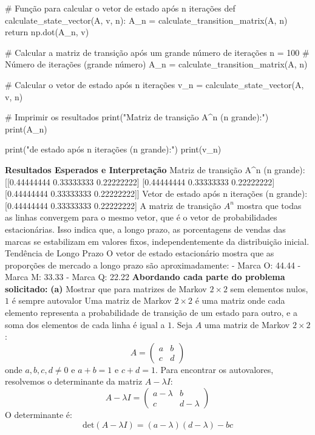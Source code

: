 {{{{        # Função para calcular o vetor de estado após n iterações
        def calculate_state_vector(A, v, n):
            A_n = calculate_transition_matrix(A, n)
            return np.dot(A_n, v)
        
        # Calcular a matriz de transição após um grande número de iterações
        n = 100  # Número de iterações (grande número)
        A_n = calculate_transition_matrix(A, n)
        
        # Calcular o vetor de estado após n iterações
        v_n = calculate_state_vector(A, v, n)
        
        # Imprimir os resultados
        print("Matriz de transição A^n (n grande):")
        print(A_n)
        
        print("\nVetor de estado após n iterações (n grande):")
        print(v_n)
}
\textbf{Resultados Esperados e Interpretação}
Matriz de transição A^n (n grande):
[[0.44444444 0.33333333 0.22222222]
 [0.44444444 0.33333333 0.22222222]
 [0.44444444 0.33333333 0.22222222]]
Vetor de estado após n iterações (n grande):
[0.44444444 0.33333333 0.22222222]
A matriz de transição \( A^n \) mostra que todas as linhas convergem para o mesmo vetor, que é o vetor de probabilidades estacionárias. Isso indica que, a longo prazo, as porcentagens de vendas das marcas se estabilizam em valores fixos, independentemente da distribuição inicial.
Tendência de Longo Prazo
O vetor de estado estacionário mostra que as proporções de mercado a longo prazo são aproximadamente:
- Marca O: 44.44%
- Marca M: 33.33%
- Marca Q: 22.22%
\textbf{Abordando cada parte do problema solicitado:}
\textbf{(a)} Mostrar que para matrizes de Markov \(2 \times 2\) sem elementos nulos, \(1\) é sempre autovalor
Uma matriz de Markov \(2 \times 2\) é uma matriz onde cada elemento representa a probabilidade de transição de um estado para outro, e a soma dos elementos de cada linha é igual a \(1\). Seja \(A\) uma matriz de Markov \(2 \times 2\):
\[ A = \begin{pmatrix}
a & b \\
c & d
\end{pmatrix} \]
onde \(a, b, c, d \neq 0\) e \(a + b = 1\) e \(c + d = 1\).
Para encontrar os autovalores, resolvemos o determinante da matriz \(A - \lambda I\):
\[ A - \lambda I = \begin{pmatrix}
a - \lambda & b \\
c & d - \lambda
\end{pmatrix} \]
O determinante é:
\[ \text{det}(A - \lambda I) = (a - \lambda)(d - \lambda) - bc \]
}}}
